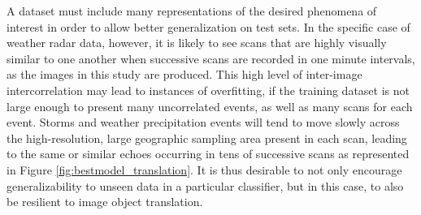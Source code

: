 A dataset must include many representations of the desired phenomena of interest in order to allow better generalization on test sets.
In the specific case of weather radar data, however, it is likely to see scans that are highly visually similar to one another when successive scans are recorded in one minute intervals, as the images in this study are produced.
This high level of inter-image intercorrelation may lead to instances of overfitting, if the training dataset is not large enough to present many uncorrelated events, as well as many scans for each event.
Storms and weather precipitation events will tend to move slowly across the high-resolution, large geographic sampling area present in each scan, leading to the same or similar echoes occurring in tens of successive scans as represented in Figure \ref{fig:bestmodel_translation}.
It is thus desirable to not only encourage generalizability to unseen data in a particular classifier, but in this case, to also be resilient to image object translation.

